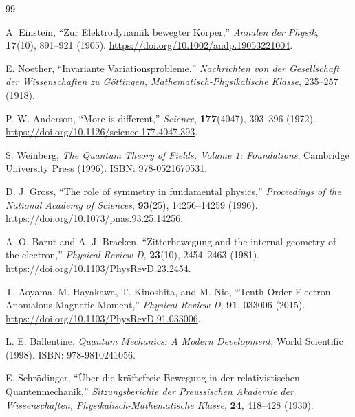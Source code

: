 \documentclass[%
 reprint,
 amsmath,amssymb,
 aps,
]{revtex4-1}
\numberwithin{equation}{section}%
\begin{document}
\begin{thebibliography}{99}


A. Einstein, ``Zur Elektrodynamik bewegter Körper,'' \textit{Annalen der Physik}, \textbf{17}(10), 891--921 (1905). \href{https://doi.org/10.1002/andp.19053221004}{https://doi.org/10.1002/andp.19053221004}.

E. Noether, ``Invariante Variationsprobleme,'' \textit{Nachrichten von der Gesellschaft der Wissenschaften zu Göttingen, Mathematisch-Physikalische Klasse}, 235--257 (1918).

P. W. Anderson, ``More is different,'' \textit{Science}, \textbf{177}(4047), 393--396 (1972). \href{https://doi.org/10.1126/science.177.4047.393}{https://doi.org/10.1126/science.177.4047.393}.

S. Weinberg, \textit{The Quantum Theory of Fields, Volume 1: Foundations}, Cambridge University Press (1996). ISBN: 978-0521670531.

D. J. Gross, ``The role of symmetry in fundamental physics,'' \textit{Proceedings of the National Academy of Sciences}, \textbf{93}(25), 14256--14259 (1996). \href{https://doi.org/10.1073/pnas.93.25.14256}{https://doi.org/10.1073/pnas.93.25.14256}.

A. O. Barut and A. J. Bracken, ``Zitterbewegung and the internal geometry of the electron,'' \textit{Physical Review D}, \textbf{23}(10), 2454--2463 (1981). \href{https://doi.org/10.1103/PhysRevD.23.2454}{https://doi.org/10.1103/PhysRevD.23.2454}.

T. Aoyama, M. Hayakawa, T. Kinoshita, and M. Nio, ``Tenth-Order Electron Anomalous Magnetic Moment,'' \textit{Physical Review D}, \textbf{91}, 033006 (2015). \href{https://doi.org/10.1103/PhysRevD.91.033006}{https://doi.org/10.1103/PhysRevD.91.033006}.

L. E. Ballentine, \textit{Quantum Mechanics: A Modern Development}, World Scientific (1998). ISBN: 978-9810241056.

E. Schrödinger, ``Über die kräftefreie Bewegung in der relativistischen Quantenmechanik,'' \textit{Sitzungsberichte der Preussischen Akademie der Wissenschaften, Physikalisch-Mathematische Klasse}, \textbf{24}, 418--428 (1930).


\end{thebibliography}
\end{document}
